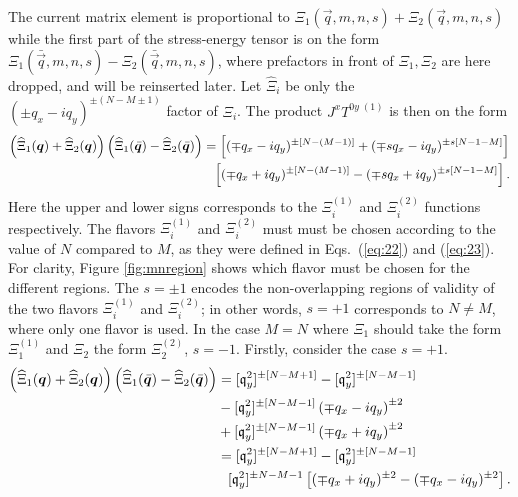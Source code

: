 The current matrix element is proportional to $\Xi_1 (\vec{q}, m, n, s) + \Xi _2(\vec{q}, m,n,s)$ while the first part of the stress-energy tensor is on the form $\Xi _1(\bar{\vec{q}}, m, n, s) - \Xi _2(\bar{\vec{q}}, m,n,s)$, where prefactors in front of $\Xi _1, \Xi _2$ are here dropped, and will be reinserted later.
Let $\widehat{\Xi}_i$ be only the $(\pm q_x - i q_y)^{\pm (N - M \pm 1)}$ factor of $\Xi _i$.
The product $J^x T^{0y \; (1)}$ is then on the form
\begin{equation}
  \begin{split}
    \left( \widehat{\Xi}_1 (\vec{q}) + \widehat{\Xi} _2(\vec{q}) \right)
    \left( \widehat{\Xi} _1(\bar{\vec{q}}) - \widehat{\Xi} _2(\bar{\vec{q}}) \right)
    &=
    \left[
      (\mp q_x - iq_y) ^{\pm [N-(M-1)]} + (\mp s q_x  - iq_y ) ^{\pm s [N-1-M]}
    \right]\\
    &\pe \left[
      (\mp  q_x + iq_y) ^{\pm  [N-(M-1)]} - (\mp s q_x  + iq_y ) ^{\pm s [N-1-M]}
    \right].
  \end{split}
\end{equation}
Here the upper and lower signs corresponds to the $\Xi _i ^{(1)}$ and $\Xi _{i} ^{(2)}$ functions respectively.
The flavors $\Xi_i^{(1)}$ and $\Xi_i ^{(2)}$ must must be chosen according to the value of $N$ compared to $M$, as they were defined in Eqs.~(\ref{eq:22}) and (\ref{eq:23}).
For clarity, Figure \ref{fig:mnregion} shows which flavor must be chosen for the different regions.
The $s = \pm 1$  encodes the non-overlapping regions of validity of the two flavors $\Xi _i^{(1)}$ and $\Xi _{i} ^{(2)}$;
in other words, $s=+1$ corresponds to $N\neq M$, where only one flavor is used.
In the case $M = N$ where $\Xi _1$ should take the form $\Xi _1 ^{(1)}$ and $\Xi _2$ the form $\Xi _2^{(2)}$, $s=-1$.
Firstly, consider the case $s=+1$.
\begin{align}
  \label{eq:29}
  \left( \widehat{\Xi}_1 (\vec{q}) + \widehat{\Xi} _2(\vec{q}) \right)
  \left( \widehat{\Xi} _1(\bar{\vec{q}}) - \widehat{\Xi} _2(\bar{\vec{q}}) \right)
  &=
    [\qvec{q}_y^2]^{\pm[N-M+1]} - [\qvec{q}_y^2]^{\pm[N-M-1]}\\
  \nonumber &- [\qvec{q}_y^2]^{\pm[N-M-1]} \left( \mp q_x - iq_y \right)^{\pm 2}\\
   \nonumber &+ [\qvec{q}_y^2]^{\pm [N-M-1]} \left( \mp q_x + iq_y \right)^{\pm 2}\\
   &= [\qvec{q}_y^2]^{\pm[N-M+1]} - [\qvec{q}_y^2]^{\pm[N-M-1]}\\
  \nonumber &\pe [\qvec{q}_{y}^{2}]^{\pm N-M-1} \left[ ( \mp q_x + iq_y)^{\pm 2} - (\mp q_x - iq_y)^{\pm 2} \right].
\end{align}
